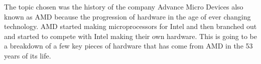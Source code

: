 \documentclass[../computer-history.tex]{subfiles}
\begin{document}
\centering


The topic chosen was the history of the company Advance Micro Devices also known as AMD because the progression of hardware in the age of ever changing technology. AMD started making microprocessors for Intel and then branched out and started to compete with Intel making their own hardware. This is going to be a breakdown of a few key pieces of hardware that has come from AMD in the 53 years of its life. 


\end{document}
